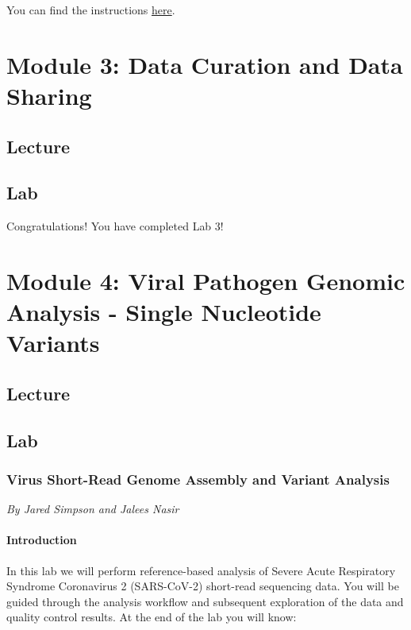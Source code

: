 \documentclass[
]{book}
\begin{document}
You can find the instructions \href{https://bioinformaticsdotca.github.io/AWS_setup}{here}.

\chapter{Module 3: Data Curation and Data Sharing}\label{module-3-data-curation-and-data-sharing}

\section{Lecture}\label{lecture-2}

\section{Lab}\label{lab}

Congratulations! You have completed Lab 3!

\chapter{Module 4: Viral Pathogen Genomic Analysis - Single Nucleotide Variants}\label{module-4-viral-pathogen-genomic-analysis---single-nucleotide-variants}

\section{Lecture}\label{lecture-3}

\section{Lab}\label{lab-1}

\subsection{Virus Short-Read Genome Assembly and Variant Analysis}\label{virus-short-read-genome-assembly-and-variant-analysis}

\emph{By Jared Simpson and Jalees Nasir}

\subsubsection{Introduction}\label{introduction}

In this lab we will perform reference-based analysis of Severe Acute Respiratory Syndrome Coronavirus 2 (SARS-CoV-2) short-read sequencing data. You will be guided through the analysis workflow and subsequent exploration of the data and quality control results. At the end of the lab you will know:
\end{document}
